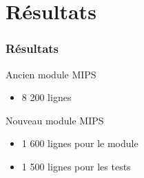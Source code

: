 \documentclass[11pt]{beamer}
\begin{document}
	\section{Résultats}
		\begin{frame}
			\frametitle{Résultats}
			\begin{block}{Ancien module MIPS}
				\begin{itemize}
					\item 8 200 lignes
				\end{itemize}
			\end{block}
			\begin{block}{Nouveau module MIPS}
				\begin{itemize}
					\item 1 600 lignes pour le module
					\item 1 500 lignes pour les tests
				\end{itemize}
			\end{block}
		\end{frame}
\end{document}
